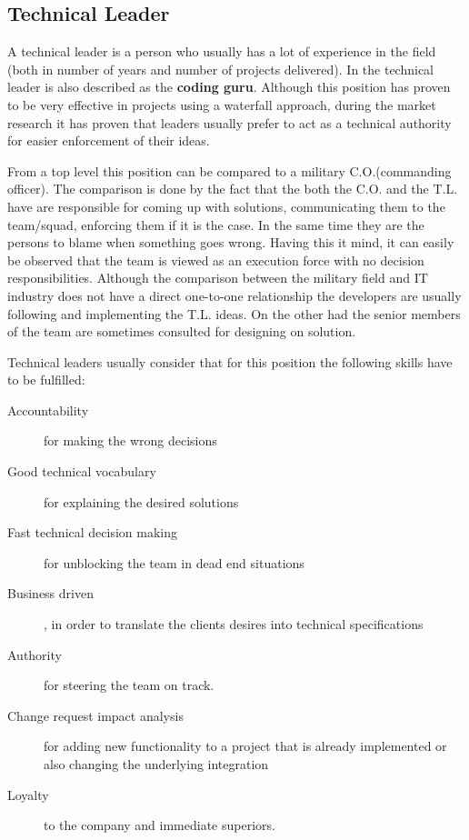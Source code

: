 \subsection{Technical Leader}
\label{sub-sec:tech-lead}
A technical leader is a person who usually has a lot of experience in the field (both in number of years and number of projects delivered). In \cite{abur-tl} the technical leader is also described as the \textbf{coding guru}. Although this position has proven to be very effective in projects using a waterfall approach, during the market research it has proven that leaders usually prefer to act as a technical authority for easier enforcement of their ideas.

From a top level this position can be compared to a military C.O.(commanding officer). The comparison is done by the fact that the both the C.O. and the T.L. have are responsible for coming up with solutions, communicating them to the team/squad, enforcing them if it is the case. In the same time they are the persons to blame when something goes wrong. Having this it mind, it can easily be observed that the team is viewed as an execution force with no decision responsibilities.  Although the comparison between the military field and IT industry does not have a direct one-to-one relationship the developers are usually following and implementing the T.L. ideas. On the other had the senior members of the team are sometimes consulted for designing on solution.

Technical leaders usually consider that for this position the following skills have to be fulfilled:
\begin{description}
\item [Accountability] for making the wrong decisions
\item [Good technical vocabulary] for explaining the desired solutions
\item [Fast technical decision making] for unblocking the team in dead end situations
\item [Business driven], in order to translate the clients desires into technical specifications
\item [Authority] for steering the team on track.
\item [Change request impact analysis] for adding new functionality  to a project that is already implemented or also changing the underlying integration
\item [Loyalty] to the company and immediate superiors.
\end{description}

